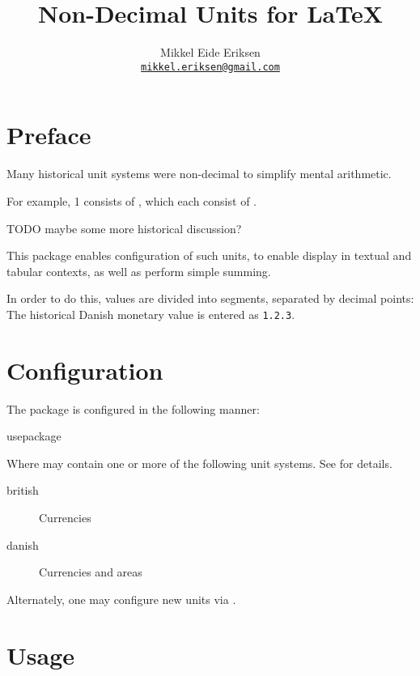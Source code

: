 \documentclass{article}
\title{Non-Decimal Units for \LaTeX}
\author{Mikkel Eide Eriksen\\\href{mailto:mikkel.eriksen@gmail.com}{\texttt{mikkel.eriksen@gmail.com}}}
\begin{document}
\maketitle

\section{Preface} %

Many historical unit systems were non-decimal to simplify mental arithmetic.

For example, 1  consists of  , which each consist of  .

TODO maybe some more historical discussion?

This package enables configuration of such units, to enable display in textual and tabular contexts, as well as perform simple summing.

In order to do this, values are divided into segments, separated by decimal points: The historical Danish monetary value  is entered as \texttt{1.2.3}.

\section{Configuration} %

The package is configured in the following manner:

\begin{docCommand}
	{usepackage}
	{}

Where  may contain one or more of the following unit systems. See  for details.

\begin{description}
\item[british] Currencies
\item[danish] Currencies and areas
\end{description}

Alternately, one may configure new units via .

\end{docCommand}

\clearpage
\section{Usage} %
\end{document}
